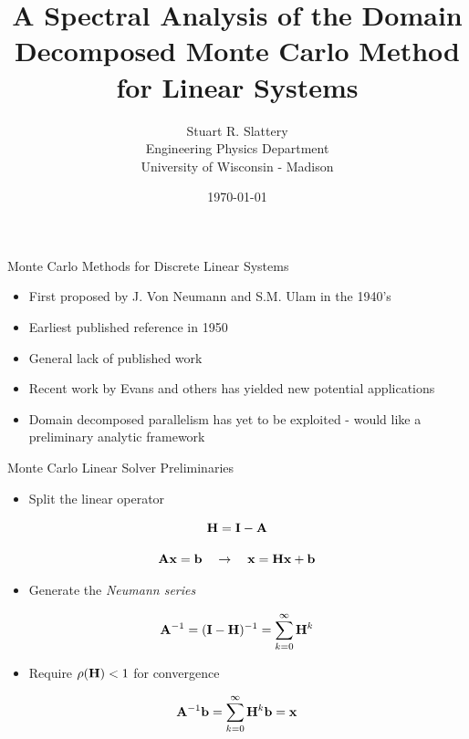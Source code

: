\documentclass{beamer}
\author{Stuart R. Slattery
  \\ Engineering Physics Department
  \\ University of Wisconsin - Madison
}
\date{\today}
\title{A Spectral Analysis of the Domain Decomposed Monte Carlo Method
for Linear Systems}
\begin{document}
\maketitle

\begin{frame}{Monte Carlo Methods for Discrete Linear Systems}

  \begin{itemize}
  \item First proposed by J. Von Neumann and S.M. Ulam in the 1940's
    \medskip \medskip
  \item Earliest published reference in 1950
    \medskip \medskip
  \item General lack of published work
    \medskip \medskip
  \item Recent work by Evans and others has yielded new potential
    applications
    \medskip \medskip
  \item Domain decomposed parallelism has yet to be exploited - would
    like a preliminary analytic framework
  \end{itemize}

\end{frame}

\begin{frame}{Monte Carlo Linear Solver Preliminaries}

  \begin{itemize}
  \item Split the linear operator
  \end{itemize}

  \[
  \mathbf{H} = \mathbf{I} - \mathbf{A}
  \]

  \[
  \mathbf{A}\mathbf{x} = \mathbf{b} \ \ \ \rightarrow \ \ \ \mathbf{x} = \mathbf{H} \mathbf{x}
  + \mathbf{b}
  \]

  \medskip
  \begin{itemize}
  \item Generate the \textit{Neumann series}
  \end{itemize}
  
  \[
  \mathbf{A}^{-1} = (\mathbf{I}-\mathbf{H})^{-1} = \sum_{k=0}^{\infty} \mathbf{H}^k
  \]

  \medskip
  \begin{itemize}
  \item Require $\rho(\mathbf{H}) < 1$ for convergence
  \end{itemize}

  \[
  \mathbf{A}^{-1}\mathbf{b} = \sum_{k=0}^{\infty} \mathbf{H}^k\mathbf{b} = \mathbf{x}
  \]

\end{frame}
\end{document}
